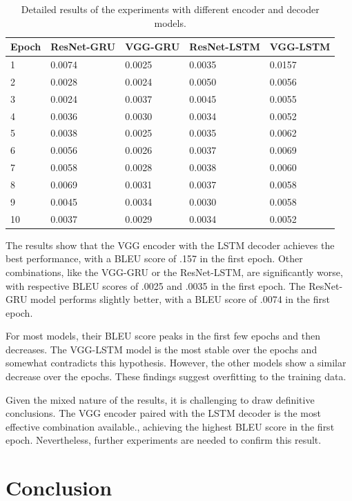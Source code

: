\documentclass[12pt]{article}
\theoremstyle{plain}
\theoremstyle{definition}
\theoremstyle{remark}
\begin{document}
\begin{table}[H]
    \begin{tabular}
 { | l | l | l | l | l | }
        \hline
 Epoch & ResNet-GRU & VGG-GRU & ResNet-LSTM & VGG-LSTM \\
        \hline
 1 & 0.0074 & 0.0025 & 0.0035 & 0.0157 \\
 2 & 0.0028 & 0.0024 & 0.0050 & 0.0056 \\
 3 & 0.0024 & 0.0037 & 0.0045 & 0.0055 \\
 4 & 0.0036 & 0.0030 & 0.0034 & 0.0052 \\
 5 & 0.0038 & 0.0025 & 0.0035 & 0.0062 \\
 6 & 0.0056 & 0.0026 & 0.0037 & 0.0069 \\
 7 & 0.0058 & 0.0028 & 0.0038 & 0.0060 \\
 8 & 0.0069 & 0.0031 & 0.0037 & 0.0058 \\
 9 & 0.0045 & 0.0034 & 0.0030 & 0.0058 \\
 10 & 0.0037 & 0.0029 & 0.0034 & 0.0052 \\
        \hline
    \end{tabular}

    \caption{Detailed results of the experiments with different encoder and decoder models.}
    \label{tab:results}
\end{table}

The results show that the VGG encoder with the LSTM decoder achieves the best performance, with a BLEU score of .157 in the first epoch. Other combinations, like the VGG-GRU or the ResNet-LSTM, are significantly worse, with respective BLEU scores of .0025 and .0035 in the first epoch. The ResNet-GRU model performs slightly better, with a BLEU score of .0074 in the first epoch.

For most models, their BLEU score peaks in the first few epochs and then decreases. The VGG-LSTM model is the most stable over the epochs and somewhat contradicts this hypothesis. However, the other models show a similar decrease over the epochs. These findings suggest overfitting to the training data.

Given the mixed nature of the results, it is challenging to draw definitive conclusions. The VGG encoder paired with the LSTM decoder is the most effective combination available., achieving the highest BLEU score in the first epoch. Nevertheless, further experiments are needed to confirm this result.


\section{Conclusion}
\label{sec:conclusion}
\end{document}
